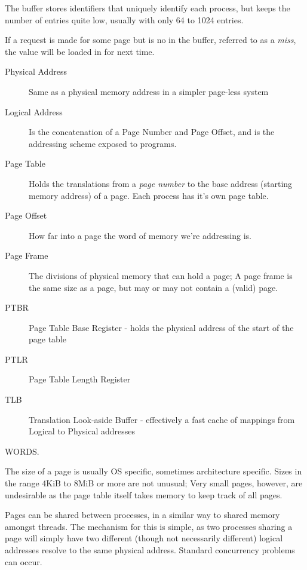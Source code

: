 \documentclass[a4]{article}
\begin{document}
The buffer stores identifiers that uniquely identify each process, but keeps the number of entries quite low, usually with only 64 to 1024 entries.

If a request is made for some page but is no in the buffer, referred to as a \textit{miss}, the value will be loaded in for next time.

\begin{description}
\item[Physical Address] Same as a physical memory address in a simpler page-less system
\item[Logical Address] Is the concatenation of a Page Number and Page Offset, and is the 
addressing scheme exposed to programs.
\item[Page Table] Holds the translations from a \textit{page number} to the base address 
(starting memory address) of a page. Each process has it's own page table.
\item[Page Offset] How far into a page the word of memory we're addressing is.
\item[Page Frame] The divisions of physical memory that can hold a page; A page frame is the same size as a page, but may or may not contain a (valid) page.
\item[PTBR] Page Table Base Register - holds the physical address of the start of the page table
\item[PTLR] Page Table Length Register
\item[TLB] Translation Look-aside Buffer - effectively a fast cache of mappings from Logical to Physical addresses
\end{description}

WORDS.

The size of a page is usually OS specific, sometimes architecture specific. Sizes in the range 4KiB to 8MiB
or more are not unusual; Very small pages, however, are undesirable as the page table itself takes 
memory to keep track of all pages.

Pages can be shared between processes, in a similar way to shared memory amongst threads. The mechanism for this is 
simple, as two processes sharing a page will simply have two different (though not necessarily different) logical 
addresses resolve to the same physical address. Standard concurrency problems can occur. 
\end{document}
